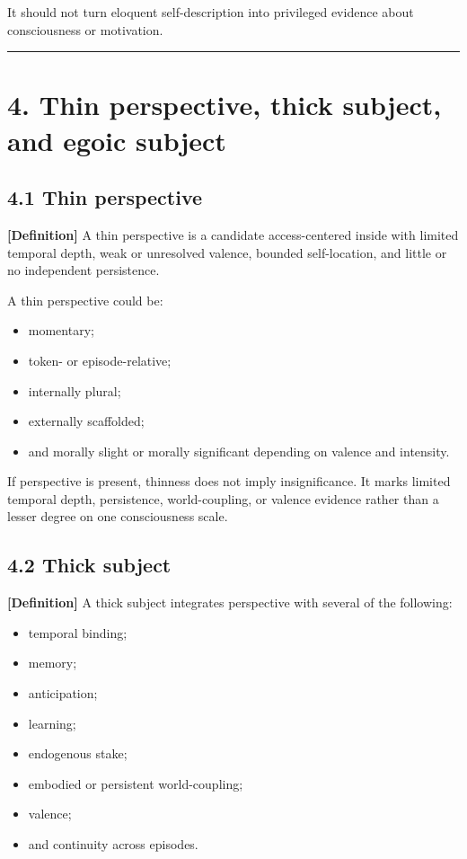 \documentclass[
  11pt,
]{article}
\providecommand{\tightlist}{%
  \setlength{\itemsep}{0pt}\setlength{\parskip}{0pt}}
\begin{document}
It should not turn eloquent self-description into privileged evidence
about consciousness or motivation.

\begin{center}\rule{0.5\linewidth}{0.5pt}\end{center}

\section{4. Thin perspective, thick subject, and egoic
subject}\label{thin-perspective-thick-subject-and-egoic-subject}

\subsection{4.1 Thin perspective}\label{thin-perspective}

\textbf{{[}Definition{]}} A thin perspective is a candidate
access-centered inside with limited temporal depth, weak or unresolved
valence, bounded self-location, and little or no independent
persistence.

A thin perspective could be:

\begin{itemize}
\tightlist
\item
  momentary;
\item
  token- or episode-relative;
\item
  internally plural;
\item
  externally scaffolded;
\item
  and morally slight or morally significant depending on valence and
  intensity.
\end{itemize}

If perspective is present, thinness does not imply insignificance. It
marks limited temporal depth, persistence, world-coupling, or valence
evidence rather than a lesser degree on one consciousness scale.

\subsection{4.2 Thick subject}\label{thick-subject}

\textbf{{[}Definition{]}} A thick subject integrates perspective with
several of the following:

\begin{itemize}
\tightlist
\item
  temporal binding;
\item
  memory;
\item
  anticipation;
\item
  learning;
\item
  endogenous stake;
\item
  embodied or persistent world-coupling;
\item
  valence;
\item
  and continuity across episodes.
\end{itemize}
\end{document}
